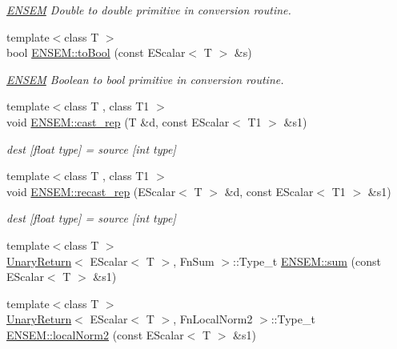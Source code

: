 \begin{DoxyCompactItemize}
\begin{DoxyCompactList}\small\item\em \mbox{\hyperlink{namespaceENSEM}{E\+N\+S\+EM}} Double to double primitive in conversion routine. \end{DoxyCompactList}\item 
{\footnotesize template$<$class T $>$ }\\bool \mbox{\hyperlink{group__escalar_ga67754bbbfd7795820548f6c6bb9c6b19}{E\+N\+S\+E\+M\+::to\+Bool}} (const E\+Scalar$<$ T $>$ \&s)
\begin{DoxyCompactList}\small\item\em \mbox{\hyperlink{namespaceENSEM}{E\+N\+S\+EM}} Boolean to bool primitive in conversion routine. \end{DoxyCompactList}\item 
{\footnotesize template$<$class T , class T1 $>$ }\\void \mbox{\hyperlink{group__escalar_ga1fe36c2ff072b322fac723a4e44f6584}{E\+N\+S\+E\+M\+::cast\+\_\+rep}} (T \&d, const E\+Scalar$<$ T1 $>$ \&s1)
\begin{DoxyCompactList}\small\item\em dest \mbox{[}float type\mbox{]} = source \mbox{[}int type\mbox{]} \end{DoxyCompactList}\item 
{\footnotesize template$<$class T , class T1 $>$ }\\void \mbox{\hyperlink{group__escalar_ga49ac1b22b18f5dd54cdf91fbf9a4e3b2}{E\+N\+S\+E\+M\+::recast\+\_\+rep}} (E\+Scalar$<$ T $>$ \&d, const E\+Scalar$<$ T1 $>$ \&s1)
\begin{DoxyCompactList}\small\item\em dest \mbox{[}float type\mbox{]} = source \mbox{[}int type\mbox{]} \end{DoxyCompactList}\item 
{\footnotesize template$<$class T $>$ }\\\mbox{\hyperlink{structUnaryReturn}{Unary\+Return}}$<$ E\+Scalar$<$ T $>$, Fn\+Sum $>$\+::Type\+\_\+t \mbox{\hyperlink{group__escalar_gae544517401e03767c9194bfe3736df37}{E\+N\+S\+E\+M\+::sum}} (const E\+Scalar$<$ T $>$ \&s1)
\item 
{\footnotesize template$<$class T $>$ }\\\mbox{\hyperlink{structUnaryReturn}{Unary\+Return}}$<$ E\+Scalar$<$ T $>$, Fn\+Local\+Norm2 $>$\+::Type\+\_\+t \mbox{\hyperlink{group__escalar_ga5612cd39905e848db7ef691d10437811}{E\+N\+S\+E\+M\+::local\+Norm2}} (const E\+Scalar$<$ T $>$ \&s1)

\end{DoxyCompactItemize}
